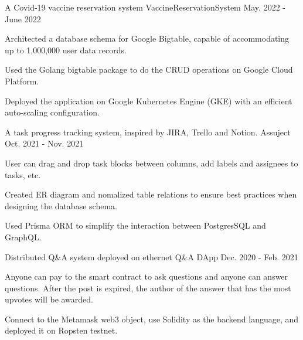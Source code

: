 

\begin{cventries}

  \cventry
  {A Covid-19 vaccine reservation system}
  {VaccineReservationSystem \href{https://github.com/MortalHappiness/VaccineReservationSystem}{\color{red}{[Github Link]}}}
  {}
  {May. 2022 - June 2022} %
  {
    \begin{cvitems} %
      \item {Architected a database schema for Google Bigtable, capable of accommodating up to 1,000,000 user data records.}
      \item {Used the Golang bigtable package to do the CRUD operations on Google Cloud Platform.}
      \item {Deployed the application on Google Kubernetes Engine (GKE) with an efficient auto-scaling configuration.}
    \end{cvitems}
  }

  \cventry
  {A task progress tracking system, inspired by JIRA, Trello and Notion.}
  {Assuject \href{https://github.com/MortalHappiness/DBM2021FallMidtermProject}{\color{red}{[Github Link]}}}
  {}
  {Oct. 2021 - Nov. 2021} %
  {
    \begin{cvitems} %
      \item {User can drag and drop task blocks between columns, add labels and assignees to tasks, etc.}
      \item {Created ER diagram and nomalized table relations to ensure best practices when designing the database schema.}
      \item {Used Prisma ORM to simplify the interaction between PostgresSQL and GraphQL.}
    \end{cvitems}
  }

  \cventry
  {Distributed Q\&A system deployed on ethernet}
  {Q\&A DApp \href{https://github.com/MortalHappiness/NMLab2020Fall-Final}{\color{red}{[Github Link]}}}
  {}
  {Dec. 2020 - Feb. 2021} %
  {
    \begin{cvitems} %
      \item {Anyone can pay to the smart contract to ask questions and anyone can answer questions. After the post is expired, the author of the answer that has the most upvotes will be awarded.}
      \item {Connect to the Metamask web3 object, use Solidity as the backend language, and deployed it on Ropsten testnet.}
    \end{cvitems}
  }


\end{cventries}
